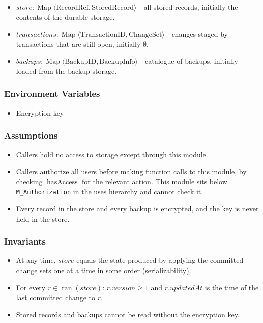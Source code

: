 \documentclass[12pt, titlepage]{article}
\begin{document}
\begin{itemize}

    \item $\mathit{store}:\operatorname{Map}\langle\text{RecordRef},\text{StoredRecord}\rangle$
    - all stored records, initially the contents of the durable storage.
    \item $\mathit{transactions}:\operatorname{Map}\langle\text{TransactionID},\text{ChangeSet}\rangle$ -
    changes staged by transactions that are still open, initially $\emptyset$.
    \item $\mathit{backups}:\operatorname{Map}\langle\text{BackupID},\text{BackupInfo}\rangle$
    - catalogue of backups, initially loaded from the backup storage.
\end{itemize}

\subsubsection{Environment Variables}

\begin{itemize}
    \item Encryption key
\end{itemize}

\subsubsection{Assumptions}

\begin{itemize}
    \item Callers hold no access to storage except through this module.
    \item Callers authorize all users before making function calls to this module,
    by checking $\operatorname{hasAccess}$ for the relevant action.
    This module sits below \texttt{M\_Authorization} in the uses hierarchy and cannot check it.
    \item Every record in the store and every backup is encrypted, and the key is never held in the store.
\end{itemize}

\subsubsection{Invariants}

\begin{itemize}
    \item At any time, $\mathit{store}$ equals the state produced by applying the committed change
    sets one at a time in some order (serializability).
    \item For every $r\in\operatorname{ran}(\mathit{store})$: $r.version\ge1$ and $r.updatedAt$ is the time of
    the last committed change to $r$.
    \item Stored records and backups cannot be read without the encryption key.
\end{itemize}
\end{document}
